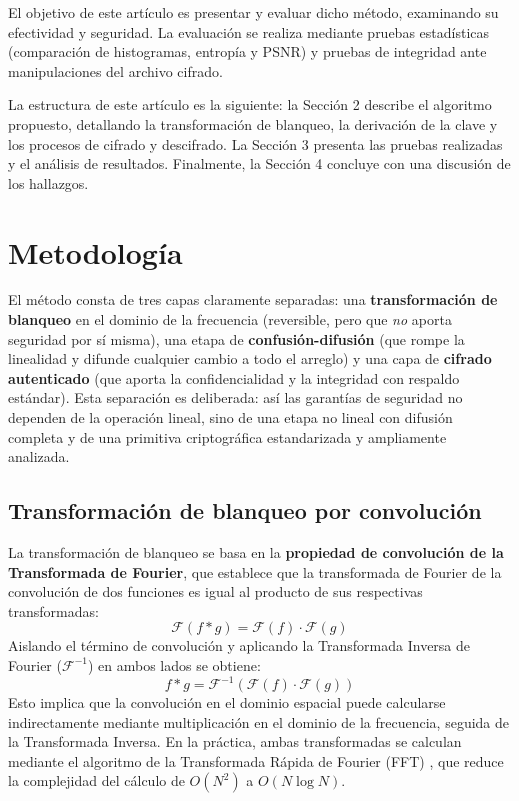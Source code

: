 \documentclass{llncs}
\begin{document}
El objetivo de este art\'iculo es presentar y evaluar dicho m\'etodo,
examinando su efectividad y seguridad. La evaluaci\'on se realiza mediante
pruebas estad\'isticas (comparaci\'on de histogramas, entrop\'ia y PSNR) y
pruebas de integridad ante manipulaciones del archivo cifrado.

La estructura de este art\'iculo es la siguiente: la Secci\'on 2 describe el
algoritmo propuesto, detallando la transformaci\'on de blanqueo, la
derivaci\'on de la clave y los procesos de cifrado y descifrado. La
Secci\'on 3 presenta las pruebas realizadas y el an\'alisis de resultados.
Finalmente, la Secci\'on 4 concluye con una discusi\'on de los hallazgos.

\section{Metodolog\'ia}

El m\'etodo consta de tres capas claramente separadas: una
\textbf{transformaci\'on de blanqueo} en el dominio de la frecuencia
(reversible, pero que \emph{no} aporta seguridad por s\'i misma), una etapa
de \textbf{confusi\'on-difusi\'on} (que rompe la linealidad y difunde
cualquier cambio a todo el arreglo) y una capa de \textbf{cifrado
autenticado} (que aporta la confidencialidad y la integridad con respaldo
est\'andar). Esta separaci\'on es deliberada: as\'i las garant\'ias de
seguridad no dependen de la operaci\'on lineal, sino de una etapa no lineal
con difusi\'on completa y de una primitiva criptogr\'afica estandarizada y
ampliamente analizada.

\subsection{Transformaci\'on de blanqueo por convoluci\'on}

La transformaci\'on de blanqueo se basa en la \textbf{propiedad de
convoluci\'on de la Transformada de Fourier}, que establece que la
transformada de Fourier de la convoluci\'on de dos funciones es igual al
producto de sus respectivas transformadas:
\[
\mathcal{F}(f * g) = \mathcal{F}(f) \cdot \mathcal{F}(g)
\]
Aislando el t\'ermino de convoluci\'on y aplicando la Transformada Inversa
de Fourier ($\mathcal{F}^{-1}$) en ambos lados se obtiene:
\[
f * g = \mathcal{F}^{-1}\left(\mathcal{F}(f) \cdot \mathcal{F}(g)\right)
\]
Esto implica que la convoluci\'on en el dominio espacial puede calcularse
indirectamente mediante multiplicaci\'on en el dominio de la frecuencia,
seguida de la Transformada Inversa. En la pr\'actica, ambas transformadas se
calculan mediante el algoritmo de la Transformada R\'apida de Fourier (FFT)
\cite{cooley}, que reduce la complejidad del c\'alculo de $O(N^2)$ a
$O(N\log N)$.
\end{document}
